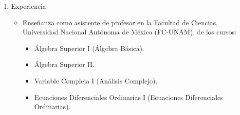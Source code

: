 \documentclass[11pt]{article}
\begin{document}
\begin{enumerate}
\item Experiencia
\label{sec:org9e4015f}
\begin{itemize}
\item Enseñanza como asistente de profesor en la Facultad de Ciencias, Universidad Nacional Autónoma de México (FC-UNAM), de los cursos:
\begin{itemize}
\item Álgebra Superior I (Álgebra Básica).
\item Álgebra Superior II.
\item Variable Compleja I (Análisis Complejo).
\item Ecuaciones Diferenciales Ordinarias I (Ecuaciones Diferenciales Ordinarias).
\end{itemize}
\end{itemize}
\end{enumerate}
\end{document}
